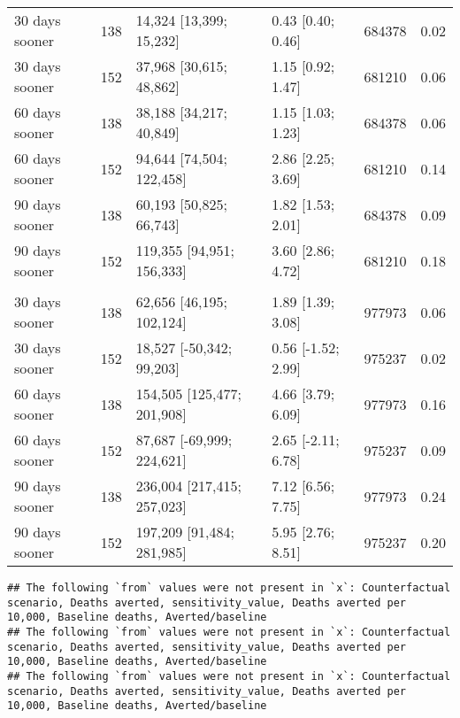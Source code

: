 \documentclass{article}
\begin{document}
\begin{table}
\begin{tabular}[t]{lrllrr}
\hspace{1em}30 days sooner & 138 & 14,324 [13,399; 15,232] & 0.43 [0.40; 0.46] & 684378 & 0.02\\
\hspace{1em}30 days sooner & 152 & 37,968 [30,615; 48,862] & 1.15 [0.92; 1.47] & 681210 & 0.06\\
\hspace{1em}60 days sooner & 138 & 38,188 [34,217; 40,849] & 1.15 [1.03; 1.23] & 684378 & 0.06\\
\hspace{1em}60 days sooner & 152 & 94,644 [74,504; 122,458] & 2.86 [2.25; 3.69] & 681210 & 0.14\\
\hspace{1em}90 days sooner & 138 & 60,193 [50,825; 66,743] & 1.82 [1.53; 2.01] & 684378 & 0.09\\
\hspace{1em}90 days sooner & 152 & 119,355 [94,951; 156,333] & 3.60 [2.86; 4.72] & 681210 & 0.18\\
\addlinespace[0.3em]
\multicolumn{6}{l}{\textbf{US to Jan 2022}}\\
\hspace{1em}30 days sooner & 138 & 62,656 [46,195; 102,124] & 1.89 [1.39; 3.08] & 977973 & 0.06\\
\hspace{1em}30 days sooner & 152 & 18,527 [-50,342; 99,203] & 0.56 [-1.52; 2.99] & 975237 & 0.02\\
\hspace{1em}60 days sooner & 138 & 154,505 [125,477; 201,908] & 4.66 [3.79; 6.09] & 977973 & 0.16\\
\hspace{1em}60 days sooner & 152 & 87,687 [-69,999; 224,621] & 2.65 [-2.11; 6.78] & 975237 & 0.09\\
\hspace{1em}90 days sooner & 138 & 236,004 [217,415; 257,023] & 7.12 [6.56; 7.75] & 977973 & 0.24\\
\hspace{1em}90 days sooner & 152 & 197,209 [91,484; 281,985] & 5.95 [2.76; 8.51] & 975237 & 0.20\\
\bottomrule
\end{tabular}
\end{table}

\begin{verbatim}
## The following `from` values were not present in `x`: Counterfactual scenario, Deaths averted, sensitivity_value, Deaths averted per 10,000, Baseline deaths, Averted/baseline
## The following `from` values were not present in `x`: Counterfactual scenario, Deaths averted, sensitivity_value, Deaths averted per 10,000, Baseline deaths, Averted/baseline
## The following `from` values were not present in `x`: Counterfactual scenario, Deaths averted, sensitivity_value, Deaths averted per 10,000, Baseline deaths, Averted/baseline
\end{verbatim}
\end{document}
